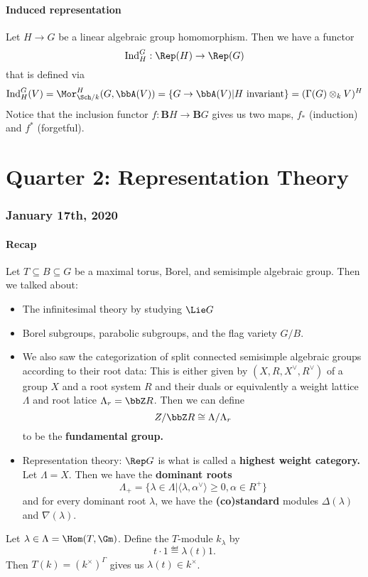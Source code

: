 \documentclass[12pt]{article}
\begin{document}
\subsection{Induced representation}
Let $H\to G$ be a linear algebraic group homomorphism. Then we have a functor 
\[\operatorname{Ind}_H^G:\Rep(H)\to\Rep(G)\]
that is defined via 
\[\operatorname{Ind}_H^G(V)=\Mor_{\Sch/k}^H(G,\bbA(V))=\{G\to \bbA(V)|\text{$H$ invariant}\}=(\Gamma(G)\otimes_k V)^H\]
Notice that the inclusion functor $f:\mathbf{B}H\to\mathbf{B}G$ gives us two maps, $f_\ast$ (induction) and $f^\ast$ (forgetful).

\part{Quarter 2: Representation Theory}
\section{January 17th, 2020}
\subsection{Recap}
Let $T\subseteq B\subseteq G$ be a maximal torus, Borel, and semisimple algebraic group. Then we talked about:
\begin{itemize}
	\item The infinitesimal theory by studying $\Lie G$
	\item Borel subgroups, parabolic subgroups, and the flag variety $G/B$.
	\item We also saw the categorization of split connected semisimple algebraic groups according to their root data:
	This is either given by $(X,R,X^\vee,R^\vee)$ of a group $X$ and a root system $R$ and their duals or equivalently a 
	weight lattice $\Lambda$ and root latice $\Lambda_r=\bbZ R$. Then we can define 
	\[Z/\bbZ R\cong \Lambda/\Lambda_r\]
	to be the \textbf{fundamental group.}
	\item Representation theory: $\Rep G$ is what is called a \textbf{highest weight category.} Let $\Lambda=X$. Then 
	we have the \textbf{dominant roots}
	\[\Lambda_+=\{\lambda\in\Lambda|\langle\lambda,\alpha^\vee\rangle\ge 0,\alpha\in R^+\}\]
	and for every dominant root $\lambda$, we have the \textbf{(co)standard} modules $\Delta(\lambda)$ and $\nabla(\lambda)$.
\end{itemize}
\begin{defn}
	Let $\lambda\in\Lambda=\Hom(T,\Gm)$. Define the $T$-module $k	_\lambda$ by 
	\[t\cdot 1\eqdef \lambda(t)1.\]
	Then $T(k)=(k^\times)^\Gamma$ gives us $\lambda(t)\in k^\times$.
\end{defn}
\end{document}
